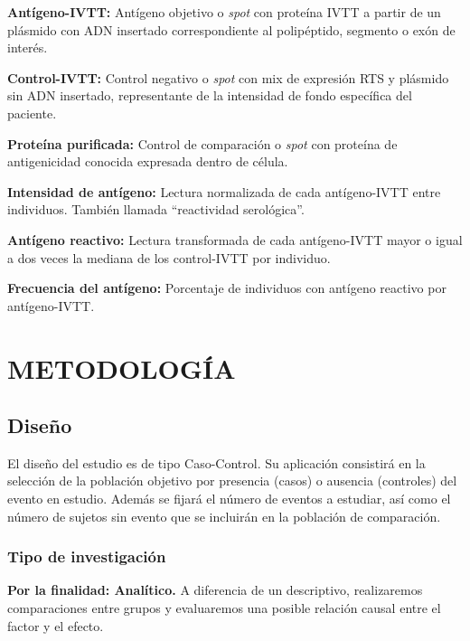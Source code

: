 \documentclass[a4paper]{article}
\begin{document}
\begin{enumerate}
\begin{enumerate}
    \textbf{Antígeno-IVTT:} Antígeno objetivo o \emph{spot} con proteína
    IVTT a partir de un plásmido con ADN insertado correspondiente al
    polipéptido, segmento o exón de interés.

    \textbf{Control-IVTT:} Control negativo o \emph{spot} con mix de
    expresión RTS y plásmido sin ADN insertado, representante de la
    intensidad de fondo específica del paciente.

    \textbf{Proteína purificada:} Control de comparación o \emph{spot}
    con proteína de antigenicidad conocida expresada dentro de célula.

    \textbf{Intensidad de antígeno:} Lectura normalizada de cada
    antígeno-IVTT entre individuos. También llamada ``reactividad
    serológica''.

    \textbf{Antígeno reactivo:} Lectura transformada de cada
    antígeno-IVTT mayor o igual a dos veces la mediana de los
    control-IVTT por individuo.

    \textbf{Frecuencia del antígeno:} Porcentaje de individuos con
    antígeno reactivo por antígeno-IVTT.
  \end{enumerate}
\end{enumerate}

\section{METODOLOGÍA}\label{meto}

\subsection{Diseño}\label{diseno}

El diseño del estudio es de tipo Caso-Control. Su aplicación consistirá
en la selección de la población objetivo por presencia (casos) o
ausencia (controles) del evento en estudio. Además se fijará el número
de eventos a estudiar, así como el número de sujetos sin evento que se
incluirán en la población de comparación.

\subsubsection{Tipo de investigación}\label{tipo-de-investigacion}

\textbf{Por la finalidad: Analítico.} A diferencia de un descriptivo,
realizaremos comparaciones entre grupos y evaluaremos una posible
relación causal entre el factor y el efecto.
\end{document}
